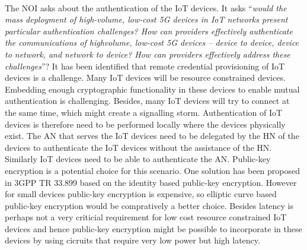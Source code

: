 \documentclass[12pt]{llncs}
\newcommand\ques[1]{``\emph{#1}''}
\begin{document}
\paragraph{}
The NOI asks about the authentication of the IoT devices. It asks \ques{would the mass deployment of high-volume, low-cost 5G devices in IoT networks present particular authentication challenges? How can providers effectively authenticate the communications of highvolume, low-cost 5G devices – device to device, device to network, and network to device? How can providers effectively address these challenges}?
It has been identified that remote credential provisioning of IoT devices is a challenge. Many IoT devices will be resource constrained devices. Embedding enough cryptographic functionality in these devices to enable mutual authentication is challenging. Besides, many IoT devices will try to connect at the same time, which might create a signalling storm. Authentication of IoT devices is therefore need to be performed locally where the devices physically exist. The AN that serves the IoT devices need to be delegated by the HN of the devices to authenticate the IoT devices without the assistance of the HN. Similarly IoT devices need to be able to authenticate the AN. Public-key encryption is a potential choice for this scenario. One solution has been proposed in 3GPP TR 33.899 based on the identity based public-key encryption. However for small devices public-key encryption is expensive, so elliptic curve based public-key encryption would be compratively a better choice. Besides latency is perhaps not a very criticial requirement for low cost resource constrained IoT devices and hence public-key encryption might be possible to incorporate in these devices by using cicruits that require very low power but high latency.
\end{document}
